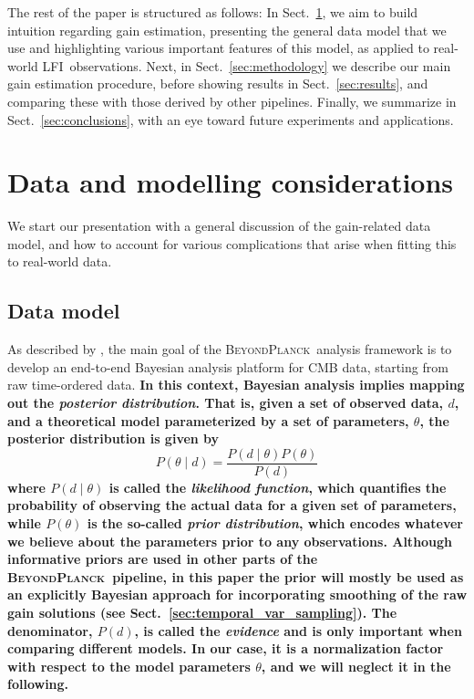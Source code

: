 \documentclass[twocolumn]{aa}
\newcommand{\BP}{\textsc{BeyondPlanck}}
\newcommand{\lfi}[0]{LFI}
\begin{document}
The rest of the paper is structured as follows: In Sect.~\ref{sec:intuition}, we aim to build intuition regarding gain estimation, presenting the general data model that we use and highlighting various important features of this model, as applied to real-world \lfi\ observations. Next, in Sect.~\ref{sec:methodology} we describe our main gain estimation procedure, before showing results in Sect.~\ref{sec:results}, and comparing these with those derived by other pipelines. Finally, we summarize in Sect.~\ref{sec:conclusions}, with an eye toward future experiments and applications.

\section{Data and modelling considerations}
\label{sec:intuition}

We start our presentation with a general discussion of the
gain-related data model, and how to account for various complications
that arise when fitting this to real-world data.

\subsection{Data model}
\label{sec:gain_modelling}
As described by \citet{bp01}, the main goal of the \BP\ analysis framework is to develop an end-to-end Bayesian analysis platform for CMB data, starting from raw time-ordered data. \textbf{In this context, Bayesian analysis implies mapping out the \emph{posterior distribution}. That is, given a set of observed data, $d$, and a theoretical model parameterized by a set of parameters, $\theta$, the posterior distribution is given by
\begin{equation}
    P(\theta \mid d) = \frac{P(d\mid \theta) P(\theta)}{P(d)}
\end{equation}
where $P(d\mid \theta)$ is called the \emph{likelihood function}, which quantifies the probability of observing the actual data for a given set of parameters, while $P(\theta)$ is the so-called \emph{prior distribution}, which encodes whatever we believe about the parameters prior to any observations. Although informative priors are used in other parts of the \BP\ pipeline, in this paper the prior will mostly be used as an explicitly Bayesian approach for incorporating smoothing of the raw gain solutions (see Sect.~\ref{sec:temporal_var_sampling}). The denominator, $P(d)$, is called the \emph{evidence} and is only important when comparing different models. In our case, it is a normalization factor with respect to the model parameters $\theta$, and we will neglect it in the following.}
\end{document}
